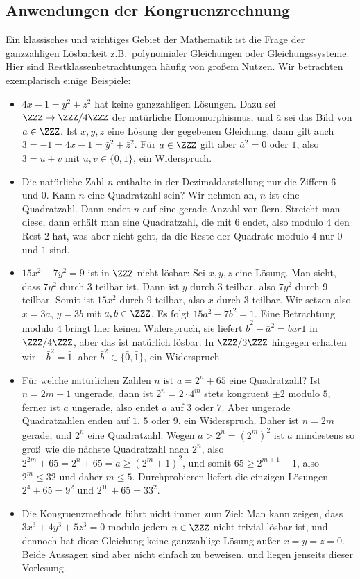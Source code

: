 \documentclass[12pt,a4paper,twoside]{article}
\begin{document}
\subsection{Anwendungen der Kongruenzrechnung}
Ein klassisches und wichtiges Gebiet der Mathematik ist die Frage der
ganzzahligen L\"osbarkeit z.B.\ polynomialer Gleichungen oder
Gleichungssysteme. Hier sind Restklassenbetrachtungen h\"aufig von gro\ss em
Nutzen. Wir betrachten exemplarisch einige Beispiele:
\begin{itemize}
\item $4x-1=y^2+z^2$ hat keine ganzzahligen L\"osungen. Dazu sei
  $\ZZZ\to\ZZZ/4\ZZZ$ der nat\"urliche Homomorphismus, und $\bar{a}$ sei das
  Bild von $a\in\ZZZ$. Ist $x,y,z$ eine L\"osung der gegebenen Gleichung, dann
  gilt auch $\bar{3}=-\bar{1}=\overline{4x-1}=\bar{y}^2+\bar{z}^2$. F\"ur
  $a\in\ZZZ$ gilt aber $\bar{a}^2=\bar{0}$ oder $\bar{1}$, also $\bar{3}=u+v$
  mit $u,v\in\{\bar{0},\bar{1}\}$, ein Widerspruch.
\item Die nat\"urliche Zahl $n$ enthalte in der Dezimaldarstellung nur die
  Ziffern $6$ und $0$. Kann $n$ eine Quadratzahl sein? Wir nehmen an, $n$ ist
  eine Quadratzahl. Dann endet $n$ auf eine gerade Anzahl von $0$ern. Streicht
  man diese, dann erh\"alt man eine Quadratzahl, die mit $6$ endet, also
  modulo $4$ den Rest $2$ hat, was aber nicht geht, da die Reste der Quadrate
  modulo $4$ nur $0$ und $1$ sind.
\item $15x^2-7y^2=9$ ist in $\ZZZ$ nicht l\"osbar: Sei $x,y,z$ eine L\"osung.
  Man sieht, dass $7y^2$ durch $3$ teilbar ist. Dann ist $y$ durch $3$
  teilbar, also $7y^2$ durch $9$ teilbar. Somit ist $15x^2$ durch $9$ teilbar,
  also $x$ durch $3$ teilbar. Wir setzen also $x=3a$, $y=3b$ mit $a,b\in\ZZZ$.
  Es folgt $15a^2-7b^2=1$. Eine Betrachtung modulo $4$ bringt hier keinen
  Widerspruch, sie liefert $\bar{b}^2-\bar{a}^2=bar 1$ in $\ZZZ/4\ZZZ$, aber
  das ist nat\"urlich l\"osbar. In $\ZZZ/3\ZZZ$ hingegen erhalten wir
  $-\bar{b}^2=\bar{1}$, aber $\bar{b}^2\in\{\bar{0},\bar{1}\}$, ein
  Widerspruch.
\item F\"ur welche nat\"urlichen Zahlen $n$ ist $a=2^n+65$ eine Quadratzahl?
  Ist $n=2m+1$ ungerade, dann ist $2^n=2\cdot 4^m$ stets kongruent $\pm2$
  modulo $5$, ferner ist $a$ ungerade, also endet $a$ auf $3$ oder $7$. Aber
  ungerade Quadratzahlen enden auf $1$, $5$ oder $9$, ein Widerspruch. Daher
  ist $n=2m$ gerade, und $2^n$ eine Quadratzahl. Wegen $a>2^n=(2^m)^2$ ist $a$
  mindestens so gro\ss\ wie die n\"achste Quadratzahl nach $2^n$, also
  $2^{2m}+65=2^n+65=a\ge (2^m+1)^2$, und somit $65\ge 2^{m+1}+1$, also $2^m\le
  32$ und daher $m\le5$. Durchprobieren liefert die einzigen L\"osungen
  $2^4+65=9^2$ und $2^{10}+65=33^2$.
\item Die Kongruenzmethode f\"uhrt nicht immer zum Ziel: Man kann zeigen, dass
  $3x^3+4y^3+5z^3=0$ modulo jedem $n\in\ZZZ$ nicht trivial l\"osbar ist, und
  dennoch hat diese Gleichung keine ganzzahlige L\"osung au\ss er $x=y=z=0$.
  Beide Aussagen sind aber nicht einfach zu beweisen, und liegen jenseits
  dieser Vorlesung.
\end{itemize}
\end{document}

